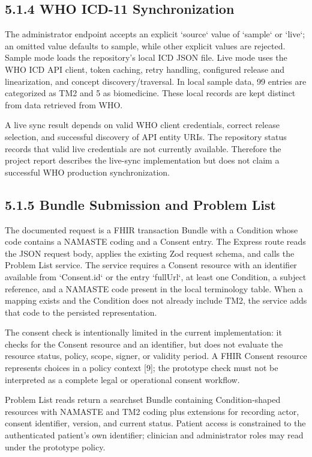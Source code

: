 \documentclass[12pt,a4paper,oneside]{report}
\begin{document}
\subsection*{5.1.4 WHO ICD-11 Synchronization}
The administrator endpoint accepts an explicit `source` value of `sample` or `live`; an omitted value defaults to sample, while other explicit values are rejected. Sample mode loads the repository's local ICD JSON file. Live mode uses the WHO ICD API client, token caching, retry handling, configured release and linearization, and concept discovery/traversal. In local sample data, 99 entries are categorized as TM2 and 5 as biomedicine. These local records are kept distinct from data retrieved from WHO.

A live sync result depends on valid WHO client credentials, correct release selection, and successful discovery of API entity URIs. The repository status records that valid live credentials are not currently available. Therefore the project report describes the live-sync implementation but does not claim a successful WHO production synchronization.

\subsection*{5.1.5 Bundle Submission and Problem List}
The documented request is a FHIR transaction Bundle with a Condition whose code contains a NAMASTE coding and a Consent entry. The Express route reads the JSON request body, applies the existing Zod request schema, and calls the Problem List service. The service requires a Consent resource with an identifier available from `Consent.id` or the entry `fullUrl`, at least one Condition, a subject reference, and a NAMASTE code present in the local terminology table. When a mapping exists and the Condition does not already include TM2, the service adds that code to the persisted representation.

The consent check is intentionally limited in the current implementation: it checks for the Consent resource and an identifier, but does not evaluate the resource status, policy, scope, signer, or validity period. A FHIR Consent resource represents choices in a policy context [9]; the prototype check must not be interpreted as a complete legal or operational consent workflow.

Problem List reads return a searchset Bundle containing Condition-shaped resources with NAMASTE and TM2 coding plus extensions for recording actor, consent identifier, version, and current status. Patient access is constrained to the authenticated patient's own identifier; clinician and administrator roles may read under the prototype policy.
\end{document}
